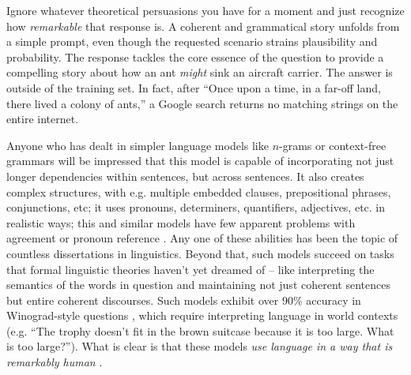 \documentclass[output=paper,colorlinks,citecolor=brown
]{langscibook}
\begin{document}
\noindent Ignore whatever theoretical persuasions you have for a moment and just recognize how \textit{remarkable} that response is. A coherent and grammatical story unfolds from a simple prompt, even though the requested scenario strains plausibility and probability. The response tackles the core essence of the question to provide a compelling story about how an ant \textit{might} sink an aircraft carrier. The answer is outside of the training set. In fact, after ``Once upon a time, in a far-off land, there lived a colony of ants,'' a Google search returns no matching strings on the entire internet.

Anyone who has dealt in simpler language models like $n$-grams or context-free grammars will be impressed that this model is capable of incorporating not just longer dependencies within sentences, but across sentences. It also creates complex structures, with e.g. multiple embedded clauses, prepositional phrases, conjunctions, etc; it uses pronouns, determiners, quantifiers, adjectives, etc. in realistic ways; this and similar models have few apparent problems with agreement or pronoun reference \citep{gulordava2018colorless,goldberg2019assessing}. Any one of these abilities has been the topic of countless dissertations in linguistics. Beyond that, such models succeed on tasks that formal linguistic theories haven't yet dreamed of -- like interpreting the semantics of the words in question and maintaining not just coherent sentences but entire coherent discourses. Such models exhibit over $90\%$ accuracy in Winograd-style questions \citep{kocijan2020review,kocijan2022defeat}, which require interpreting language in world contexts (e.g. ``The trophy doesn’t fit in the brown suitcase because it is too large. What is too large?''). What is clear is that these models \textit{use language in a way that is remarkably human} \citep{mahowald2023dissociating}. 


\end{document}
